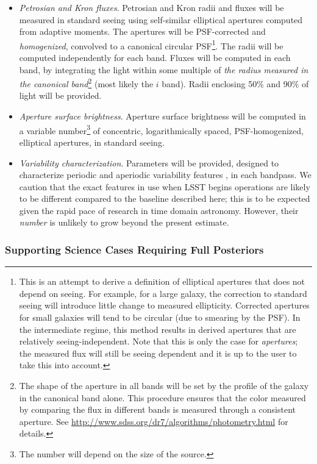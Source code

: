 \documentclass[SE,lsstdraft,toc]{lsstdoc}
\begin{document}
\begin{itemize}
    \item \emph{Petrosian and Kron fluxes}. Petrosian and Kron radii and fluxes will be measured in standard seeing using self-similar elliptical apertures computed from adaptive moments. The apertures will be PSF-corrected and \emph{homogenized}, convolved to a canonical circular PSF\footnote{This is an attempt to derive a definition of elliptical apertures that does not depend on seeing. For example, for a large galaxy, the correction to standard seeing will introduce little change to measured ellipticity. Corrected apertures for small galaxies will tend to be circular (due to smearing by the PSF). In the intermediate regime, this method results in derived apertures that are relatively seeing-independent. Note that this is only the case for \emph{apertures}; the measured flux will still be seeing dependent and it is up to the user to take this into account.}. The radii will be computed independently for each band. Fluxes will be computed in each band, by integrating the light within some multiple of \emph{the radius measured in the canonical band}\footnote{The shape of the aperture in all bands will be set by the profile of the galaxy in the canonical band alone. This procedure ensures that the color measured by comparing the flux in different bands is measured through a consistent aperture. See \url{http://www.sdss.org/dr7/algorithms/photometry.html} for details.} (most likely the $i$ band). Radii enclosing 50\% and 90\% of light will be provided. 

    \item \emph{Aperture surface brightness}. Aperture surface brightness will be computed in a variable number\footnote{The number will depend on the size of the source.} of concentric, logarithmically spaced, PSF-homogenized, elliptical apertures, in standard seeing. 

    \item \emph{Variability characterization}. Parameters will be provided, designed to characterize periodic and aperiodic variability features \citep{2011ApJ...733...10R}, in each bandpass.
    We caution that the exact features in use when LSST begins operations are likely to be different compared to the baseline described here; this is to be expected given the rapid pace of research in time domain astronomy. However, their \emph{number} is unlikely to grow beyond the present estimate. 
\end{itemize}

\subsubsection{Supporting Science Cases Requiring Full Posteriors}
\end{document}

